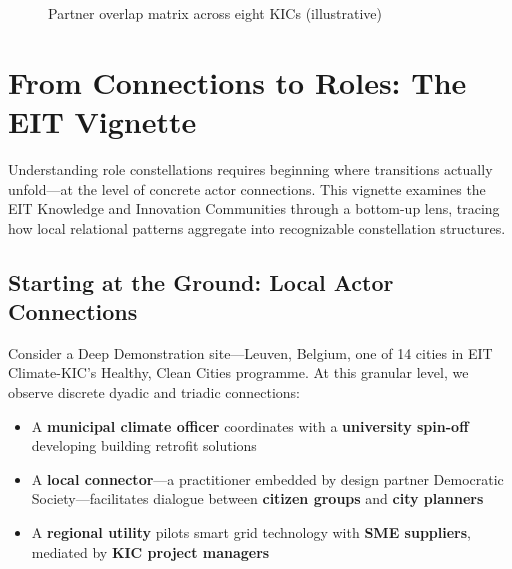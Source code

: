 \documentclass[11pt,a4paper]{article}
\begin{document}
\begin{figure}[htbp]
\caption{Partner overlap matrix across eight KICs (illustrative)}
\label{fig:overlap-matrix}
\end{figure}


\section{From Connections to Roles: The EIT Vignette}

Understanding role constellations requires beginning where transitions actually unfold---at the level of concrete actor connections. This vignette examines the EIT Knowledge and Innovation Communities through a bottom-up lens, tracing how local relational patterns aggregate into recognizable constellation structures.

\subsection{Starting at the Ground: Local Actor Connections}

Consider a Deep Demonstration site---Leuven, Belgium, one of 14 cities in EIT Climate-KIC's Healthy, Clean Cities programme. At this granular level, we observe discrete dyadic and triadic connections:

\begin{itemize}[noitemsep,topsep=2pt]
    \item A \textbf{municipal climate officer} coordinates with a \textbf{university spin-off} developing building retrofit solutions
    \item A \textbf{local connector}---a practitioner embedded by design partner Democratic Society---facilitates dialogue between \textbf{citizen groups} and \textbf{city planners}
    \item A \textbf{regional utility} pilots smart grid technology with \textbf{SME suppliers}, mediated by \textbf{KIC project managers}
\end{itemize}
\end{document}
